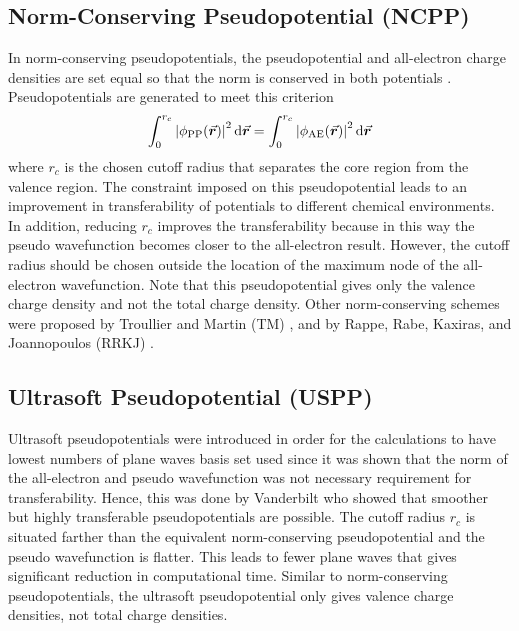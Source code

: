 \subsection{Norm-Conserving Pseudopotential (NCPP)}
In norm-conserving pseudopotentials, the pseudopotential and all-electron charge densities are set  equal so that the norm is conserved in both potentials \citep{Hamann1979,Troullier1991}. Pseudopotentials are generated to meet this criterion 
\begin{equation}
    \int_0^{r_c} \abs{\phi_{\text{PP}}(\va*{r})}^2 \dd{\va*{r}} = \int_0^{r_c} \abs{\phi_{\text{AE}}(\va*{r})}^2 \dd{\va*{r}}
\end{equation} 
where $r_c$ is the chosen cutoff radius that separates the core region from the valence region. The constraint imposed on this pseudopotential leads to an improvement in transferability of potentials to different chemical environments. In addition, reducing $r_c$ improves the transferability  because in this way the pseudo wavefunction becomes closer to the all-electron result. However, the cutoff radius should be chosen outside the location of the maximum node of the all-electron wavefunction. Note that this pseudopotential gives only the valence charge density and not the total charge density. Other norm-conserving schemes were proposed by Troullier and Martin (TM) \citep{Troullier1991}, and by Rappe, Rabe, Kaxiras, and Joannopoulos (RRKJ) \citep{Rappe1990}.

\subsection{Ultrasoft Pseudopotential (USPP)}
Ultrasoft pseudopotentials were introduced in order for the calculations to have lowest numbers of plane waves basis set used since it was shown that the norm of the all-electron and pseudo wavefunction was not necessary requirement for transferability. Hence, this was done by Vanderbilt \citep{Vanderbilt1990} who showed that smoother but highly transferable pseudopotentials are possible. The cutoff radius $r_c$ is situated farther than the equivalent norm-conserving pseudopotential and the pseudo wavefunction is flatter. This leads to fewer plane waves that gives significant reduction in computational time. Similar to norm-conserving pseudopotentials, the ultrasoft pseudopotential only gives valence charge densities, not total charge
densities.

